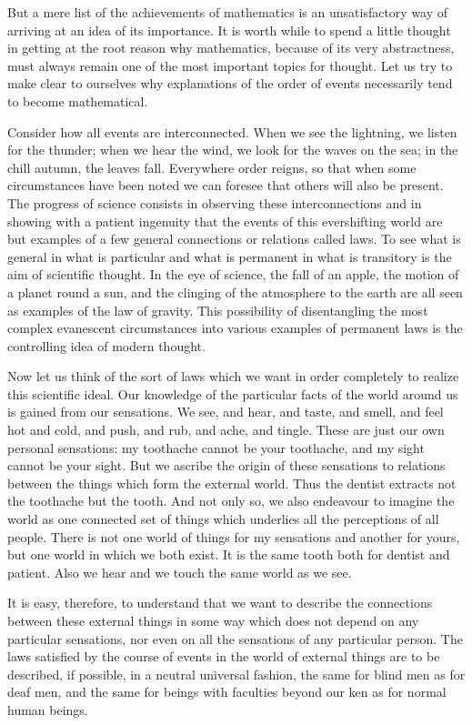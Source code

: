 \documentclass[12pt,leqno]{book}[2005/09/16]
\newcommand{\PageSep}[1]{\ignorespaces}
\begin{document}
But a mere list of the achievements of
mathematics is an unsatisfactory way of
arriving at an idea of its importance. It is
worth while to spend a little thought in
getting at the root reason why mathematics,
because of its very abstractness, must always
remain one of the most important topics
\PageSep{11}
for thought. Let us try to make clear to
ourselves why explanations of the order of
events necessarily tend to become mathematical.

Consider how all events are interconnected.
When we see the lightning, we listen for the
thunder; when we hear the wind, we look
for the waves on the sea; in the chill autumn,
the leaves fall. Everywhere order reigns, so
that when some circumstances have been
noted we can foresee that others will also be
present. The progress of science consists in
observing these interconnections and in showing
with a patient ingenuity that the events
of this evershifting world are but examples of
a few general connections or relations called
laws. To see what is general in what is particular
and what is permanent in what is
transitory is the aim of scientific thought. In
the eye of science, the fall of an apple, the
motion of a planet round a sun, and the clinging
of the atmosphere to the earth are all
seen as examples of the law of gravity. This
possibility of disentangling the most complex
evanescent circumstances into various examples
of permanent laws is the controlling
idea of modern thought.

Now let us think of the sort of laws which
we want in order completely to realize this
scientific ideal. Our knowledge of the particular
facts of the world around us is gained
\PageSep{12}
from our sensations. We see, and hear, and
taste, and smell, and feel hot and cold, and
push, and rub, and ache, and tingle. These
are just our own personal sensations: my
toothache cannot be your toothache, and my
sight cannot be your sight. But we ascribe
the origin of these sensations to relations between
the things which form the external
world. Thus the dentist extracts not the
toothache but the tooth. And not only so,
we also endeavour to imagine the world as
one connected set of things which underlies
all the perceptions of all people. There is not
one world of things for my sensations and another
for yours, but one world in which we
both exist. It is the same tooth both for
dentist and patient. Also we hear and we
touch the same world as we see.

It is easy, therefore, to understand that we
want to describe the connections between
these external things in some way which does
not depend on any particular sensations, nor
even on all the sensations of any particular
person. The laws satisfied by the course of
events in the world of external things are to
be described, if possible, in a neutral universal
fashion, the same for blind men as for
deaf men, and the same for beings with
faculties beyond our ken as for normal human
beings.
\end{document}
